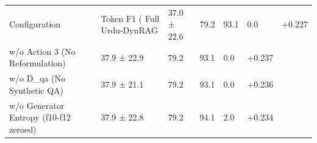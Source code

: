 \begin{tabular}{llllll}
\toprule
Configuration & Token F1 (%
\midrule
Full Urdu-DynRAG & 37.0 ± 22.6 & 79.2 & 93.1 & 0.0 & +0.227 \\
w/o Action 3 (No Reformulation) & 37.9 ± 22.9 & 79.2 & 93.1 & 0.0 & +0.237 \\
w/o D_qa (No Synthetic QA) & 37.9 ± 21.1 & 79.2 & 93.1 & 0.0 & +0.236 \\
w/o Generator Entropy (f10-f12 zeroed) & 37.9 ± 22.8 & 79.2 & 94.1 & 2.0 & +0.234 \\
\bottomrule
\end{tabular}
